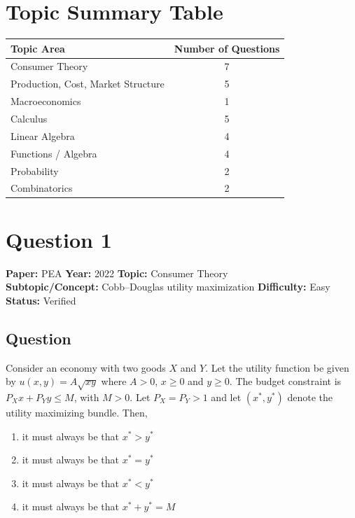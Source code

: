 \documentclass[11pt]{article}
\begin{document}
\bigskip

\section*{Topic Summary Table}

\begin{center}
\begin{tabular}{l c}
\toprule
Topic Area & Number of Questions \\
\midrule
Consumer Theory                  & 7 \\
Production, Cost, Market Structure & 5 \\
Macroeconomics                   & 1 \\
Calculus                         & 5 \\
Linear Algebra                   & 4 \\
Functions / Algebra              & 4 \\
Probability                      & 2 \\
Combinatorics                    & 2 \\
\bottomrule
\end{tabular}
\end{center}

\newpage

\section*{Question 1}
\textbf{Paper:} PEA \quad \textbf{Year:} 2022 \quad \textbf{Topic:} Consumer Theory \\
\textbf{Subtopic/Concept:} Cobb--Douglas utility maximization \quad \textbf{Difficulty:} Easy \\
\textbf{Status:} Verified

\subsection*{Question}
Consider an economy with two goods $X$ and $Y$. Let the utility function be given by
$u(x,y) = A\sqrt{xy}$ where $A > 0$, $x \geq 0$ and $y \geq 0$. The budget constraint is
$P_X x + P_Y y \leq M$, with $M > 0$. Let $P_X = P_Y > 1$ and let $(x^*, y^*)$ denote the
utility maximizing bundle. Then,
\begin{enumerate}[label=(\Alph*)]
\item it must always be that $x^* > y^*$
\item it must always be that $x^* = y^*$
\item it must always be that $x^* < y^*$
\item it must always be that $x^* + y^* = M$
\end{enumerate}
\end{document}
